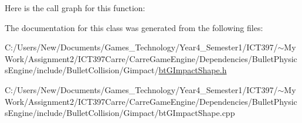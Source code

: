 Here is the call graph for this function:

The documentation for this class was generated from the following files:\begin{CompactItemize}
\item 
C:/Users/New/Documents/Games\_\-Technology/Year4\_\-Semester1/ICT397/$\sim$My Work/Assignment2/ICT397Carre/CarreGameEngine/Dependencies/BulletPhysicsEngine/include/BulletCollision/Gimpact/\hyperlink{bt_g_impact_shape_8h}{btGImpactShape.h}\item 
C:/Users/New/Documents/Games\_\-Technology/Year4\_\-Semester1/ICT397/$\sim$My Work/Assignment2/ICT397Carre/CarreGameEngine/Dependencies/BulletPhysicsEngine/include/BulletCollision/Gimpact/btGImpactShape.cpp\end{CompactItemize}
